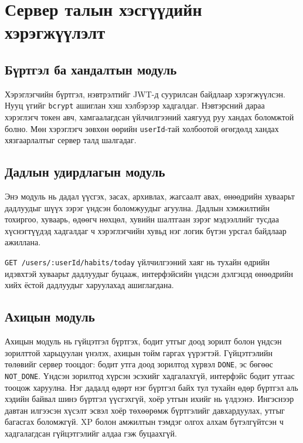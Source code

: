 \section{Сервер талын хэсгүүдийн хэрэгжүүлэлт}

\subsection{Бүртгэл ба хандалтын модуль}

Хэрэглэгчийн бүртгэл, нэвтрэлтийг JWT-д суурилсан байдлаар хэрэгжүүлсэн. Нууц үгийг \texttt{bcrypt} ашиглан хэш хэлбэрээр хадгалдаг. Нэвтэрсний дараа хэрэглэгч токен авч, хамгаалагдсан үйлчилгээний хаягууд руу хандах боломжтой болно. Мөн хэрэглэгч зөвхөн өөрийн \texttt{userId}-тай холбоотой өгөгдөлд хандах хязгаарлалтыг сервер талд шалгадаг.

\subsection{Дадлын удирдлагын модуль}

Энэ модуль нь дадал үүсгэх, засах, архивлах, жагсаалт авах, өнөөдрийн хуваарьт дадлуудыг шүүх зэрэг үндсэн боломжуудыг агуулна. Дадлын хэмжилтийн тохиргоо, хуваарь, өдөөгч нөхцөл, хувийн шалтгаан зэрэг мэдээллийг тусдаа хүснэгтүүдэд хадгалдаг ч хэрэглэгчийн хувьд нэг логик бүтэн урсгал байдлаар ажиллана.

\texttt{GET /users/:userId/habits/today} үйлчилгээний хаяг нь тухайн өдрийн идэвхтэй хуваарьт дадлуудыг буцааж, интерфэйсийн үндсэн дэлгэцэд өнөөдрийн хийх ёстой дадлуудыг харуулахад ашиглагдана.

\subsection{Ахицын модуль}

Ахицын модуль нь гүйцэтгэл бүртгэх, бодит утгыг доод зорилт болон үндсэн зорилттой харьцуулан үнэлэх, ахицын тойм гаргах үүрэгтэй. Гүйцэтгэлийн төлөвийг сервер тооцдог: бодит утга доод зорилтод хүрвэл \texttt{DONE}, эс бөгөөс \texttt{NOT\_DONE}. Үндсэн зорилтод хүрсэн эсэхийг хадгалахгүй, интерфэйс бодит утгаас тооцож харуулна. Нэг дадалд өдөрт нэг бүртгэл байх тул тухайн өдөр бүртгэл аль хэдийн байвал шинэ бүртгэл үүсгэхгүй, хоёр утгын ихийг нь үлдээнэ. Ингэснээр давтан илгээсэн хүсэлт эсвэл хоёр төхөөрөмж бүртгэлийг давхардуулах, утгыг багасгах боломжгүй. XP болон амжилтын тэмдэг олгох алхам бүтэлгүйтсэн ч хадгалагдсан гүйцэтгэлийг алдаа гэж буцаахгүй.

